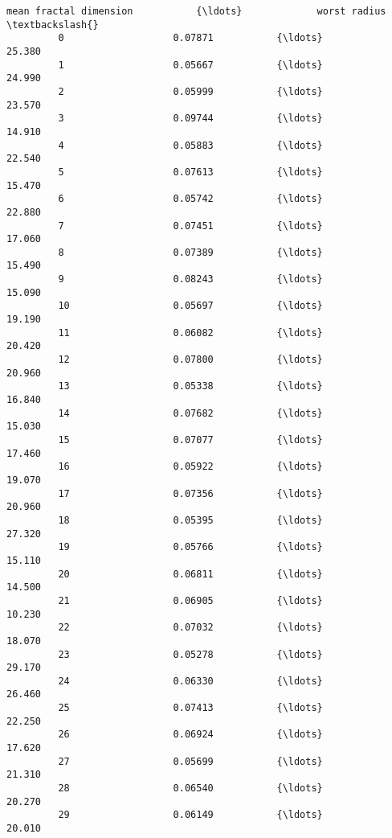 \documentclass[11pt]{article}
\begin{document}
\begin{Verbatim}[commandchars=\\\{\}]
              mean fractal dimension           {\ldots}             worst radius  \textbackslash{}
         0                   0.07871           {\ldots}                   25.380   
         1                   0.05667           {\ldots}                   24.990   
         2                   0.05999           {\ldots}                   23.570   
         3                   0.09744           {\ldots}                   14.910   
         4                   0.05883           {\ldots}                   22.540   
         5                   0.07613           {\ldots}                   15.470   
         6                   0.05742           {\ldots}                   22.880   
         7                   0.07451           {\ldots}                   17.060   
         8                   0.07389           {\ldots}                   15.490   
         9                   0.08243           {\ldots}                   15.090   
         10                  0.05697           {\ldots}                   19.190   
         11                  0.06082           {\ldots}                   20.420   
         12                  0.07800           {\ldots}                   20.960   
         13                  0.05338           {\ldots}                   16.840   
         14                  0.07682           {\ldots}                   15.030   
         15                  0.07077           {\ldots}                   17.460   
         16                  0.05922           {\ldots}                   19.070   
         17                  0.07356           {\ldots}                   20.960   
         18                  0.05395           {\ldots}                   27.320   
         19                  0.05766           {\ldots}                   15.110   
         20                  0.06811           {\ldots}                   14.500   
         21                  0.06905           {\ldots}                   10.230   
         22                  0.07032           {\ldots}                   18.070   
         23                  0.05278           {\ldots}                   29.170   
         24                  0.06330           {\ldots}                   26.460   
         25                  0.07413           {\ldots}                   22.250   
         26                  0.06924           {\ldots}                   17.620   
         27                  0.05699           {\ldots}                   21.310   
         28                  0.06540           {\ldots}                   20.270   
         29                  0.06149           {\ldots}                   20.010   

\end{Verbatim}
\end{document}
